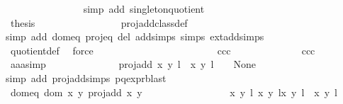 \begin{isabellebody}
\ \ \ \ \ \ \ \ \ \ \ \ \ \ \isamarkupfalse%
\ {\isacharparenleft}simp\ add{\isacharcolon}\ singleton{\isacharunderscore}quotient{\isacharparenright}\ \ \ \ \ \ \ \ \ \ \ \ \isanewline
\ \ \ \ \ \ \ \ \ \ \ \ \isamarkupfalse%
\ \isamarkupfalse%
\ {\isacharquery}thesis\isanewline
\ \ \ \ \ \ \ \ \ \ \ \ \ \ \isamarkupfalse%
\ {}\ proj{\isacharunderscore}add{\isacharunderscore}class{\isacharunderscore}def\ \isamarkupfalse%
{\isacharparenleft}simp\ add{\isacharcolon}\ dom{\isacharunderscore}eq\ proj{\isacharunderscore}eq\ del{\isacharcolon}\ add{\isachardot}simps\ {\isasymtau}{\isachardot}simps\ ext{\isacharunderscore}add{\isachardot}simps{\isacharparenright}\isanewline
\ \ \ \ \ \ \ \ \ \ \ \ \ \ \isamarkupfalse%
\ quotient{\isacharunderscore}def\ \isamarkupfalse%
\ force\isanewline
\ \ \ \ \ \ \ \ \ \ \isamarkupfalse%
\isanewline
\ \ \ \ \ \ \ \ \ \ \ \ \isamarkupfalse%
\ ccc\isanewline
\ \ \ \ \ \ \ \ \ \ \ \ \isamarkupfalse%
\ ccc\ \isamarkupfalse%
\ aaa{\isacharunderscore}simp{\isacharcolon}\isanewline
\ \ \ \ \ \ \ \ \ \ \ \ \ \ {\isachardoublequoteopen}proj{\isacharunderscore}add\ {\isacharparenleft}{\isacharparenleft}x{\isacharcomma}\ y{\isacharparenright}{\isacharcomma}\ l{\isacharparenright}\ {\isacharparenleft}{\isasymtau}\ {\isacharparenleft}x{\isacharprime}{\isacharcomma}\ y{\isacharprime}{\isacharparenright}{\isacharcomma}\ l{\isacharprime}\ {\isacharplus}\ {}{\isacharparenright}\ {\isacharequal}\ None{\isachardoublequoteclose}\isanewline
\ \ \ \ \ \ \ \ \ \ \ \ \ \ \isamarkupfalse%
{\isacharparenleft}simp\ add{\isacharcolon}\ proj{\isacharunderscore}add{\isachardot}simps\ p{\isacharunderscore}q{\isacharunderscore}expr{\isacharparenleft}{}{\isacharparenright}{\isacharcomma}blast{\isacharparenright}\isanewline
\ \ \ \ \ \ \ \ \ \ \ \ \isamarkupfalse%
\ \isamarkupfalse%
\ dom{\isacharunderscore}eq{\isacharcolon}\ {\isachardoublequoteopen}{\isacharparenleft}dom\ {\isacharparenleft}{\isasymlambda}{\isacharparenleft}x{\isacharcomma}\ y{\isacharparenright}{\isachardot}\ proj{\isacharunderscore}add\ x\ y{\isacharparenright}\ {\isasyminter}\isanewline
\ \ \ \ \ \ \ \ \ \ \ \ \ \ \ \ {\isacharbraceleft}{\isacharparenleft}{\isacharparenleft}{\isacharparenleft}x{\isacharcomma}\ y{\isacharparenright}{\isacharcomma}\ l{\isacharparenright}{\isacharcomma}\ {\isacharparenleft}x{\isacharprime}{\isacharcomma}\ y{\isacharprime}{\isacharparenright}{\isacharcomma}\ l{\isacharprime}{\isacharparenright}{\isacharcomma}{\isacharparenleft}{\isacharparenleft}{\isacharparenleft}x{\isacharcomma}\ y{\isacharparenright}{\isacharcomma}\ l{\isacharparenright}{\isacharcomma}\ {\isasymtau}\ {\isacharparenleft}x{\isacharprime}{\isacharcomma}\ y{\isacharprime}{\isacharparenright}{\isacharcomma}\ l{\isacharprime}\ {\isacharplus}\ {}{\isacharparenright}{\isacharbraceright}{\isacharparenright}\ {\isacharequal}\ \isanewline

\end{isabellebody}
